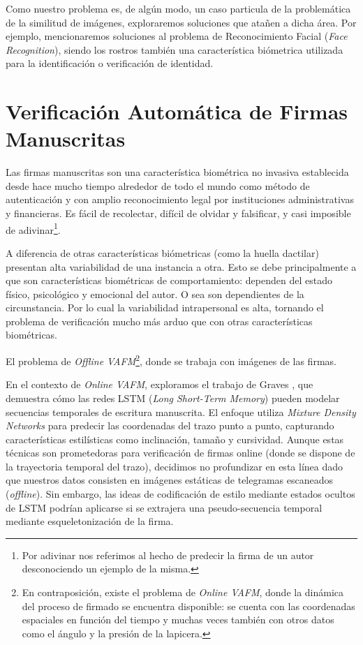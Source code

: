 Como nuestro problema es, de algún modo, un caso particula de la problemática de la similitud de imágenes, exploraremos soluciones que atañen a dicha área. Por ejemplo, mencionaremos soluciones al problema de Reconocimiento Facial (\textit{Face Recognition}), siendo los rostros también una característica biómetrica utilizada para la identificación o verificación de identidad.

\section{Verificación Automática de Firmas Manuscritas} \label{veriificacion-automatica-de-firmas-manuscritas}

Las firmas manuscritas son una característica biométrica no invasiva establecida desde hace mucho tiempo alrededor de todo el mundo como método de autenticación y con amplio reconocimiento legal por instituciones administrativas y financieras. Es fácil de recolectar, difícil de olvidar y falsificar, y casi imposible de adivinar\footnote{Por adivinar nos referimos al hecho de predecir la firma de un autor desconociendo un ejemplo de la misma.}.

A diferencia de otras características biómetricas (como la huella dactilar) presentan alta variabilidad de una instancia a otra. Esto se debe principalmente a que son características biométricas de comportamiento: dependen del estado físico, psicológico y emocional del autor. O sea son dependientes de la circunstancia. Por lo cual la variabilidad intrapersonal es alta, tornando el problema de verificación mucho más arduo que con otras características biométricas.

El problema de \textit{Offline VAFM}\footnote{En contraposición, existe el problema de \textit{Online VAFM}, donde la dinámica del proceso de firmado se encuentra disponible: se cuenta con las coordenadas espaciales en función del tiempo y muchas veces también con otros datos como el ángulo  y la presión de la lapicera. }, donde se trabaja con imágenes de las firmas. 

En el contexto de \textit{Online VAFM}, exploramos el trabajo de Graves \cite{graves-handwriting-generation}, que demuestra cómo las redes LSTM (\textit{Long Short-Term Memory}) pueden modelar secuencias temporales de escritura manuscrita. El enfoque utiliza \textit{Mixture Density Networks} para predecir las coordenadas del trazo punto a punto, capturando características estilísticas como inclinación, tamaño y cursividad. Aunque estas técnicas son prometedoras para verificación de firmas online (donde se dispone de la trayectoria temporal del trazo), decidimos no profundizar en esta línea dado que nuestros datos consisten en imágenes estáticas de telegramas escaneados (\textit{offline}). Sin embargo, las ideas de codificación de estilo mediante estados ocultos de LSTM podrían aplicarse si se extrajera una pseudo-secuencia temporal mediante esqueletonización de la firma.

